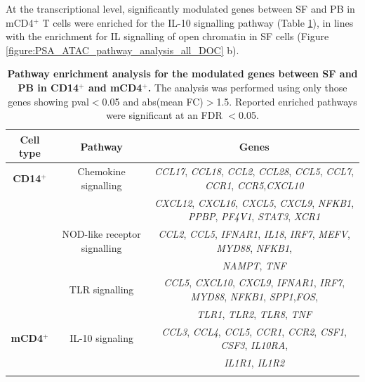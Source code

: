 At the transcriptional level, significantly modulated genes between SF and PB in mCD4$^+$ T cells were enriched for the IL-10 signalling pathway (Table \ref{table:PSA_PCR_array_pathway_analysis}), in lines with the enrichment for IL signalling of open chromatin in SF cells (Figure \ref{figure:PSA_ATAC_pathway_analysis_all_DOC} b). %


\begin{landscape}
\begin{center}
\begin{longtable}[ht]{c c c }
\caption[Pathway enrichment analysis for the modulated genes between SF and PB in CD14$^+$ and mCD4$^+$.]{\textbf{Pathway enrichment analysis for the modulated genes between SF and PB in CD14$^+$ and mCD4$^+$.} The analysis was performed using only those genes showing pval$<$0.05 and abs(mean FC)$>$1.5. Reported enriched pathways were significant at an FDR $<$0.05.}
\label{table:PSA_PCR_array_pathway_analysis} \\
\toprule
\textbf{Cell type} & \textbf{Pathway} & \textbf{Genes} \\						
\midrule
\midrule
\textbf{CD14$^+$} & Chemokine signalling & \textit{CCL17}, \textit{CCL18}, \textit{CCL2}, \textit{CCL28}, \textit{CCL5}, \textit{CCL7}, \textit{CCR1}, \textit{CCR5},\textit{CXCL10} \\  
									&                             & \textit{CXCL12}, \textit{CXCL16}, \textit{CXCL5}, \textit{CXCL9}, \textit{NFKB1}, \textit{PPBP}, \textit{PF4V1}, \textit{STAT3}, \textit{XCR1}\\
									
									& NOD-like receptor signalling & \textit{CCL2}, \textit{CCL5}, \textit{IFNAR1}, \textit{IL18}, \textit{IRF7}, \textit{MEFV}, \textit{MYD88}, \textit{NFKB1}, \\
									&                                         & \textit{NAMPT}, \textit{TNF} \\

									& TLR signalling   & \textit{CCL5}, \textit{CXCL10}, \textit{CXCL9}, \textit{IFNAR1}, \textit{IRF7}, \textit{MYD88}, \textit{NFKB1}, \textit{SPP1},\textit{FOS},\\ 
									&                                         & \textit{TLR1}, \textit{TLR2}, \textit{TLR8}, \textit{TNF}\\

\midrule
\textbf{mCD4$^+$} & IL-10 signaling & \textit{CCL3}, \textit{CCL4}, \textit{CCL5}, \textit{CCR1}, \textit{CCR2}, \textit{CSF1}, \textit{CSF3}, \textit{IL10RA}, \\
									&									& \textit{IL1R1}, \textit{IL1R2}\\
\bottomrule
\medskip
\end{longtable}
\end{center}
\end{landscape}

